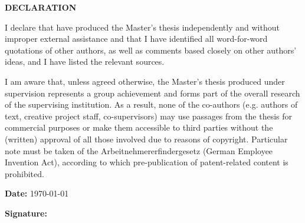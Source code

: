 \newpage
\thispagestyle{empty}

\clearpage
\cleardoublepage
{}
\begin{center}
    \textbf{\large DECLARATION}
\end{center}


I declare that have produced the Master’s thesis \textbf{\thesisTitle} independently and without improper external assistance and that I have identified all
word-for-word quotations of other authors, as well as comments based closely on other authors’ ideas, and I have listed the relevant sources.


I am aware that, unless agreed otherwise, the Master’s thesis  produced under supervision represents a group achievement and forms part of the overall
research of the supervising institution. As a result, none of the co-authors (e.g. authors of text, creative project staff, co-supervisors) may use passages
from the thesis for commercial purposes or make them accessible to third parties without the (written) approval of all those involved due to reasons of copyright.
Particular note must be taken of the Arbeitnehmererfindergesetz (German Employee Invention Act), according to which pre-publication of patent-related content is prohibited.




\vspace*{2cm}
\noindent
\begin{minipage}[t]{0.5\textwidth}
    \textbf{Date:} \today
\end{minipage}%
\begin{minipage}[t]{0.5\textwidth}
    \flushright
    \textbf{Signature:} \underline{\hspace{4cm}}
\end{minipage}
